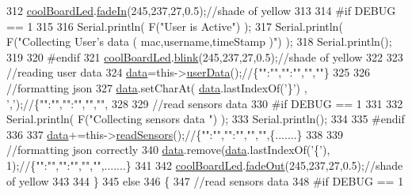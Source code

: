 \begin{DoxyCode}
312         \hyperlink{classCoolBoard_a1b1d3c684a5baa56b08486e192fd8e97}{coolBoardLed}.\hyperlink{classCoolBoardLed_ab778f5e7bed0ab74e3906d82110493c3}{fadeIn}(245,237,27,0.5);\textcolor{comment}{//shade of yellow}
313     
314 \textcolor{preprocessor}{    #if DEBUG == 1}
315 
316         Serial.println( F(\textcolor{stringliteral}{"User is Active"}) );
317         Serial.println( F(\textcolor{stringliteral}{"Collecting User's data ( mac,username,timeStamp )"}) );
318         Serial.println();
319     
320 \textcolor{preprocessor}{    #endif  }
321         \hyperlink{classCoolBoard_a1b1d3c684a5baa56b08486e192fd8e97}{coolBoardLed}.\hyperlink{classCoolBoardLed_a96e1ea13003eee34c9dbcef340404426}{blink}(245,237,27,0.5);\textcolor{comment}{//shade of yellow   }
322 
323         \textcolor{comment}{//reading user data}
324         \hyperlink{classCoolBoard_a427fb753dd8575bdf821c70a5c63d695}{data}=this->\hyperlink{classCoolBoard_ae7358fb6e623cfc81b775f5f1734909b}{userData}();\textcolor{comment}{//\{"":"","":"","",""\}}
325 
326         \textcolor{comment}{//formatting json }
327         \hyperlink{classCoolBoard_a427fb753dd8575bdf821c70a5c63d695}{data}.setCharAt( \hyperlink{classCoolBoard_a427fb753dd8575bdf821c70a5c63d695}{data}.lastIndexOf(\textcolor{charliteral}{'\}'}) , \textcolor{charliteral}{','});\textcolor{comment}{//\{"":"","":"","","",}
328                 
329         \textcolor{comment}{//read sensors data}
330 \textcolor{preprocessor}{    #if DEBUG == 1}
331 
332         Serial.println( F(\textcolor{stringliteral}{"Collecting sensors data "}) );
333         Serial.println();
334     
335 \textcolor{preprocessor}{    #endif}
336 
337         \hyperlink{classCoolBoard_a427fb753dd8575bdf821c70a5c63d695}{data}+=this->\hyperlink{classCoolBoard_ad03abdce2e65f520bbf2cff0f2d083cf}{readSensors}();\textcolor{comment}{//\{"":"","":"","","",\{.......\}     }
338 
339         \textcolor{comment}{//formatting json correctly}
340         \hyperlink{classCoolBoard_a427fb753dd8575bdf821c70a5c63d695}{data}.remove(\hyperlink{classCoolBoard_a427fb753dd8575bdf821c70a5c63d695}{data}.lastIndexOf(\textcolor{charliteral}{'\{'}), 1);\textcolor{comment}{//\{"":"","":"","","",.......\}}
341         
342         \hyperlink{classCoolBoard_a1b1d3c684a5baa56b08486e192fd8e97}{coolBoardLed}.\hyperlink{classCoolBoardLed_a93d545679237e8cc858324367149775c}{fadeOut}(245,237,27,0.5);\textcolor{comment}{//shade of yellow}
343                 
344     \}   
345     \textcolor{keywordflow}{else}
346     \{
347         \textcolor{comment}{//read sensors data}
348 \textcolor{preprocessor}{    #if DEBUG == 1}

\end{DoxyCode}
